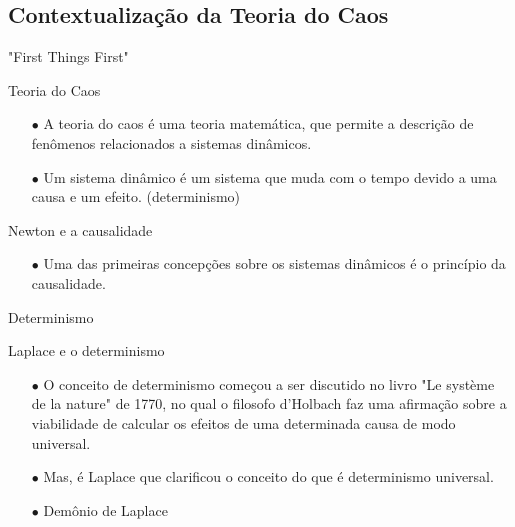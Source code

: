 \documentclass{beamer}
\begin{document}
\subsection{Contextualização da Teoria do Caos}
\begin{frame}{"First Things First"}
    \begin{exampleblock}{Teoria do Caos}
        \begin{itemize}
		\item [$\bullet$] A teoria do caos é uma teoria matemática, que permite a descrição de fenômenos relacionados a sistemas dinâmicos.
		\item [$\bullet$] Um sistema dinâmico é um sistema que muda com o tempo devido a uma causa e um efeito. (determinismo)
        \end{itemize}
    \end{exampleblock}
    \begin{exampleblock}{Newton e a causalidade}
    	\begin{itemize}
    		\item [$\bullet$] Uma das primeiras concepções sobre os sistemas dinâmicos é o princípio da causalidade.
    	\end{itemize}
    \end{exampleblock}
\end{frame}

\begin{frame}{Determinismo}
			
	\begin{exampleblock}{Laplace e o determinismo}
		\begin{itemize}
			\item [$\bullet$] O conceito de determinismo começou a ser discutido no livro "Le système de la nature"  de 1770, no qual o filosofo d'Holbach faz uma afirmação sobre a viabilidade de calcular os efeitos de uma determinada causa de modo universal.
			
			\item [$\bullet$] Mas, é Laplace que clarificou o conceito do que é determinismo universal.
			
			\item [$\bullet$] Demônio de Laplace
		\end{itemize}
	\end{exampleblock}
\end{frame}
\end{document}
